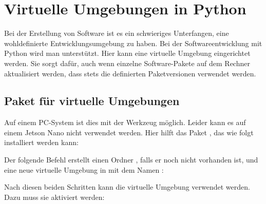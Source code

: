 %
%





\chapter{Virtuelle Umgebungen in Python}


Bei der Erstellung von Software ist es ein schwieriges Unterfangen, eine wohldefinierte Entwicklungsumgebung zu haben. Bei der Softwareentwicklung mit Python wird man unterstützt. Hier kann eine virtuelle Umgebung eingerichtet werden. Sie sorgt dafür, auch wenn einzelne Software-Pakete auf dem Rechner aktualisiert werden, dass stets die definierten Paketversionen verwendet werden. 




\section{Paket  für virtuelle Umgebungen}

Auf einem PC-System ist dies mit der Werkzeug  möglich. Leider kann es auf einem Jetson Nano nicht verwendet werden. Hier hilft das Paket , das wie folgt installiert werden kann:

\medskip
	

\medskip

Der folgende Befehl erstellt einen Ordner , falls er noch nicht vorhanden ist, und eine neue virtuelle Umgebung 
in  mit dem Namen :

\medskip


\medskip

Nach diesen beiden Schritten kann die virtuelle Umgebung verwendet werden. Dazu muss sie aktiviert werden:
\medskip


